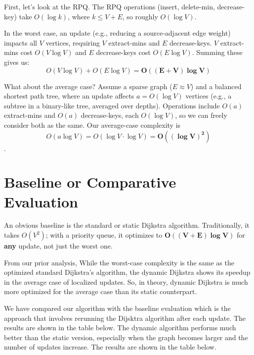 \documentclass[12pt]{article}
\begin{document}
 First, let's look at the RPQ. The RPQ operations (insert, delete-min, decrease-key) take \(O(\log k)\), where \(k \leq V + E\), so roughly \(O(\log V)\).

In the worst case, an update (e.g., reducing a source-adjacent edge weight) impacts all \(V\) vertices, requiring \(V\) extract-mins and \(E\) decrease-keys. \(V\) extract-mins cost \(O(V \log V)\) and \(E\) decrease-keys cost \(O(E \log V)\). Summing these gives us:
\[
O(V \log V) + O(E \log V) = \mathbf{O((E+V) \log V)}
\]

What about the average case? Assume a sparse graph (\(E \approx V\)) and a balanced shortest path tree, where an update affects \(a = O(\log V)\) vertices (e.g., a subtree in a binary-like tree, averaged over depths). Operations include \(O(a)\) extract-mins and \(O(a)\) decrease-keys, each \(O(\log V)\), so we can freely consider both as the same. Our average-case complexity is \[O(a \log V) = O(\log V \cdot \log V) = \mathbf{O((\log V)^2)}\].

\section*{Baseline or Comparative Evaluation}

An obvious baseline is the standard or static Dijkstra algorithm. Traditionally, it takes $O(V^2)$; with a priority queue, it optimizes to $\mathbf{O((V+E)\log V)}$ for \textbf{any} update, not just the worst one.

From our prior analysis, While the worst-case complexity is the same as the optimized standard Dijkstra's algorithm, the dynamic Dijkstra shows its speedup in the average case of localized updates. So, in theory, dynamic Dijkstra is much more optimized for the average case than its static counterpart.


We have compared our algorithm with the baseline evaluation which is the approach that involves rerunning the Dijsktra algorithm after each update. The results are shown in the table below. The dynamic algorithm performs much better than the static version, especially when the graph becomes larger and the number of updates increase. The results are shown in the table below.

\begin{table}[h!]
\centering
{}
\caption{Comparison of Static and Dynamic Dijkstra's Algorithm}
\end{table}
\end{document}
